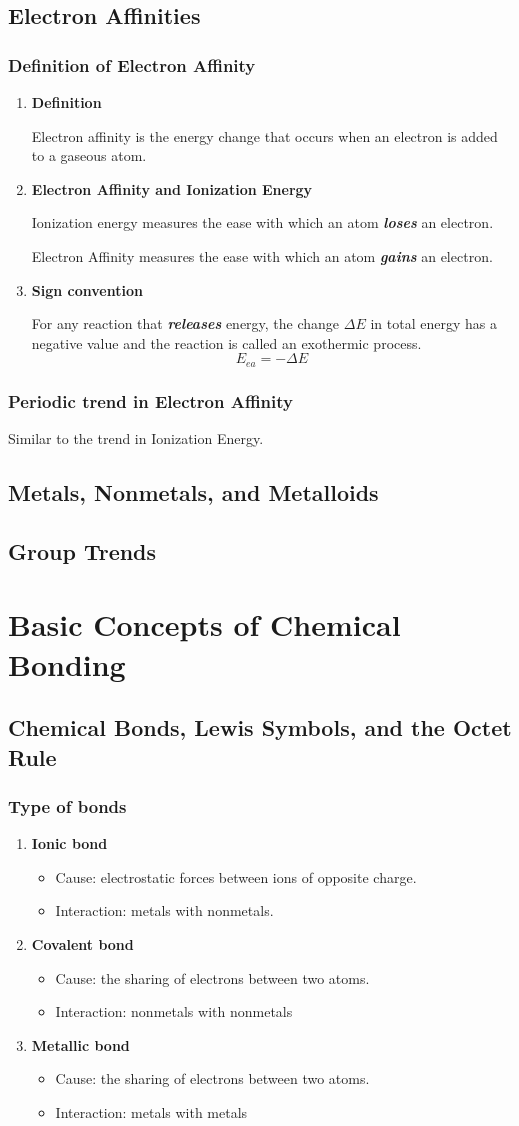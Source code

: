 \documentclass[12pt, a4paper]{report}
\newcommand{\impt}[1]{\textbf{\textit{#1}}}
\newcommand{\hi}{\section}
\newcommand{\hii}{\subsection}
\newcommand{\hiiBEGIN}[1]{\subsection{#1} \begin{enumerate}}
\newcommand{\hiiEND}{\end{enumerate}}
\newcommand{\hiii}{\item\textbf}
\newcommand{\Dt}{\Delta}
\begin{document}
\hi{Electron Affinities}
    \hiiBEGIN{Definition of Electron Affinity}
        \hiii{Definition}
            \par Electron affinity is the energy change that occurs when an electron is added
            to a gaseous atom.
        \hiii{Electron Affinity and Ionization Energy}
            \par Ionization energy measures the ease with which an atom \impt{loses} an electron.
            \par Electron Affinity measures the ease with which an atom \impt{gains} an electron.
        \hiii{Sign convention}
            \par For any reaction that \impt{releases} energy, the change $\Dt E$ in total energy
            has a negative value and the reaction is called an exothermic process.
            \begin{equation}
                E_{ea} = - \Dt E
            \end{equation}
    \hiiEND
    \hii{Periodic trend in Electron Affinity}
        \par Similar to the trend in Ionization Energy.

\hi{Metals, Nonmetals, and Metalloids}

\hi{Group Trends}

\chapter{Basic Concepts of Chemical Bonding}

\hi{Chemical Bonds, Lewis Symbols, and the Octet Rule}
    \hiiBEGIN{Type of bonds}
        \hiii{Ionic bond}
            \begin{itemize}
                \item Cause: electrostatic forces between ions of opposite charge.
                \item Interaction: metals with nonmetals.
            \end{itemize}

        \hiii{Covalent bond}
            \begin{itemize}
                \item Cause: the sharing of electrons between two atoms.
                \item Interaction: nonmetals with nonmetals
            \end{itemize}

        \hiii{Metallic bond}
            \begin{itemize}
                \item Cause: the sharing of electrons between two atoms.
                \item Interaction: metals with metals
            \end{itemize}
    \hiiEND
\end{document}
